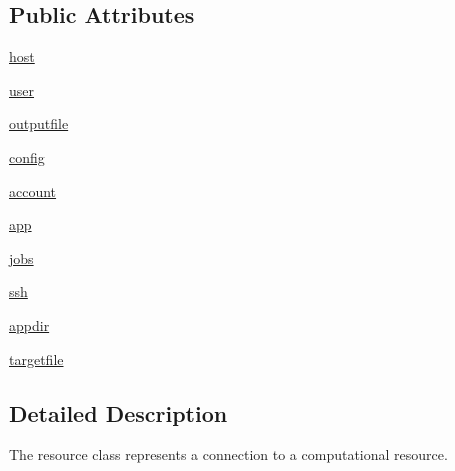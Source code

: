 \subsection*{\-Public \-Attributes}
\begin{DoxyCompactItemize}
\item 
\hyperlink{classcyberweb_1_1lib_1_1jodis_1_1resources_1_1resource_a91984ff84e44ff0f42b7f4b472b87030}{host}
\item 
\hyperlink{classcyberweb_1_1lib_1_1jodis_1_1resources_1_1resource_ad45e5547ad297102b42ad4eee31c56ce}{user}
\item 
\hyperlink{classcyberweb_1_1lib_1_1jodis_1_1resources_1_1resource_af0e466576a8b4c7ab387e8a6e9d45501}{outputfile}
\item 
\hyperlink{classcyberweb_1_1lib_1_1jodis_1_1resources_1_1resource_ab6bc4ccb41d4cec98ce14625c431de08}{config}
\item 
\hyperlink{classcyberweb_1_1lib_1_1jodis_1_1resources_1_1resource_a7f775fd4cdb7822f070dad6d743b2991}{account}
\item 
\hyperlink{classcyberweb_1_1lib_1_1jodis_1_1resources_1_1resource_a58971514822583bbb56a44599762caad}{app}
\item 
\hyperlink{classcyberweb_1_1lib_1_1jodis_1_1resources_1_1resource_a947070b7a584afcd828dd3649714586f}{jobs}
\item 
\hyperlink{classcyberweb_1_1lib_1_1jodis_1_1resources_1_1resource_a9a6a47f6f1e016f54c2cff4ea4bedba3}{ssh}
\item 
\hyperlink{classcyberweb_1_1lib_1_1jodis_1_1resources_1_1resource_acbd174ae742e2bdc0ff24eeaa69906a9}{appdir}
\item 
\hyperlink{classcyberweb_1_1lib_1_1jodis_1_1resources_1_1resource_abcc35cf30e32a6e030bafd742ace7b0f}{targetfile}
\end{DoxyCompactItemize}


\subsection{\-Detailed \-Description}
\begin{DoxyVerb}
The resource class represents a connection to a computational resource.
\end{DoxyVerb}
 

